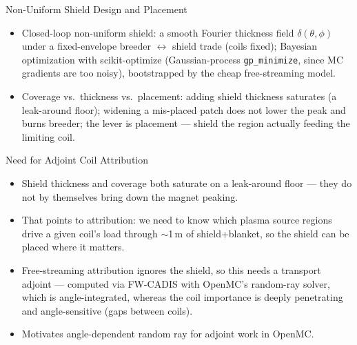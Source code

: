 \documentclass[aspectratio=169]{beamer}
\begin{document}
\begin{frame}{Non-Uniform Shield Design and Placement}
  \small
  \begin{itemize}
    \item Closed-loop non-uniform shield: a smooth Fourier thickness field
      $\delta(\theta,\phi)$ under a fixed-envelope breeder $\leftrightarrow$
      shield trade (coils fixed); Bayesian optimization with scikit-optimize
      (Gaussian-process \texttt{gp\_minimize}, since MC gradients are too noisy),
      bootstrapped by the cheap free-streaming model.
    \item Coverage vs.\ thickness vs.\ placement: adding shield thickness
      saturates (a leak-around floor); widening a mis-placed patch does
      not lower the peak and burns breeder; the lever is placement ---
      shield the region actually feeding the limiting coil.
  \end{itemize}
\end{frame}

\begin{frame}{Need for Adjoint Coil Attribution}
  \small
  \begin{itemize}
    \item Shield thickness and coverage both saturate on a leak-around floor ---
      they do not by themselves bring down the magnet peaking.
    \item That points to attribution: we need to know which plasma source regions
      drive a given coil's load through $\sim$1\,m of shield+blanket, so the
      shield can be placed where it matters.
    \item Free-streaming attribution ignores the shield, so this needs a
      transport adjoint --- computed via FW-CADIS with OpenMC's random-ray
      solver, which is angle-integrated, whereas the coil importance is deeply
      penetrating and angle-sensitive (gaps between coils).
    \item Motivates angle-dependent random ray for adjoint work in OpenMC.
  \end{itemize}
\end{frame}
\end{document}
